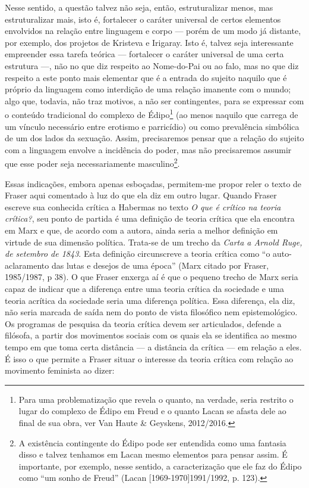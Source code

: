 Nesse sentido, a questão talvez não seja, então, estruturalizar menos,
mas estruturalizar mais, isto é, fortalecer o caráter universal de
certos elementos envolvidos na relação entre linguagem e corpo --- porém
de um modo já distante, por exemplo, dos projetos de Kristeva e
Irigaray. Isto é, talvez seja interessante empreender essa tarefa
teórica --- fortalecer o caráter universal de uma certa estrutura ---, não
no que diz respeito ao Nome-do-Pai ou ao falo, mas no que diz respeito a
este ponto mais elementar que é a entrada do sujeito naquilo que é
próprio da linguagem como interdição de uma relação imanente com o
mundo; algo que, todavia, não traz motivos, a não ser contingentes, para
se expressar com o conteúdo tradicional do complexo de Édipo\footnote{Para
  uma problematização que revela o quanto, na verdade, seria restrito o
  lugar do complexo de Édipo em Freud e o quanto Lacan se afasta dele ao
  final de sua obra, ver Van Haute \& Geyskens, 2012/2016.} (ao menos
naquilo que carrega de um vínculo necessário entre erotismo e
parricídio) ou como prevalência simbólica de um dos lados da sexuação.
Assim, precisaremos pensar que a relação do sujeito com a linguagem
envolve a incidência do poder, mas não precisaremos assumir que esse
poder seja necessariamente masculino\footnote{A existência contingente
  do Édipo pode ser entendida como uma fantasia disso e talvez tenhamos
  em Lacan mesmo elementos para pensar assim. É importante, por exemplo,
  nesse sentido, a caracterização que ele faz do Édipo como ``um sonho
  de Freud'' (Lacan {[}1969-1970{]}1991/1992, p. 123).}.

Essas indicações, embora apenas esboçadas, permitem-me propor reler o
texto de Fraser aqui comentado à luz do que ela diz em outro lugar.
Quando Fraser escreve sua conhecida crítica a Habermas no texto \emph{O
que é crítico na teoria crítica?}, seu ponto de partida é uma definição
de teoria crítica que ela encontra em Marx e que, de acordo com a
autora, ainda seria a melhor definição em virtude de sua dimensão
política. Trata-se de um trecho da \emph{Carta a Arnold Ruge, de
setembro de 1843}. Esta definição circunscreve a teoria crítica como ``o
auto-aclaramento das lutas e desejos de uma época'' (Marx citado por
Fraser, 1985/1987, p 38). O que Fraser enxerga aí é que o pequeno trecho
de Marx seria capaz de indicar que a diferença entre uma teoria crítica
da sociedade e uma teoria acrítica da sociedade seria uma diferença
política. Essa diferença, ela diz, não seria marcada de saída nem do
ponto de vista filosófico nem epistemológico. Os programas de pesquisa
da teoria crítica devem ser articulados, defende a filósofa, a partir
dos movimentos sociais com os quais ela se identifica ao mesmo tempo em
que toma certa distância --- a distância da crítica --- em relação a eles.
É isso o que permite a Fraser situar o interesse da teoria crítica com
relação ao movimento feminista ao dizer:


